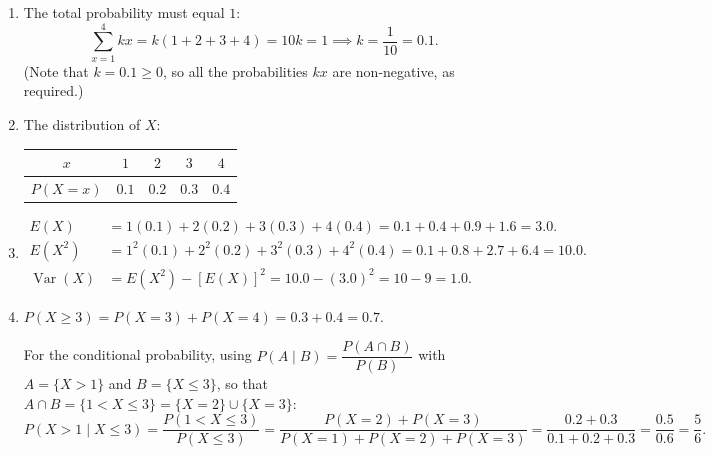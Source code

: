 \documentclass[11pt]{article}
\begin{document}
\begin{corrige}
\begin{enumerate}
\item The total probability must equal $1$:
\[ \sum_{x=1}^{4} kx = k(1 + 2 + 3 + 4) = 10k = 1 \implies k = \frac{1}{10} = 0.1. \]
(Note that $k = 0.1 \ge 0$, so all the probabilities $kx$ are non-negative, as required.)
\item The distribution of $X$:
\begin{center}
\begin{tabular}{|c|c|c|c|c|}
\hline
\rowcolor{popblueL} $x$ & $1$ & $2$ & $3$ & $4$ \\
\hline
$P(X = x)$ & $0.1$ & $0.2$ & $0.3$ & $0.4$ \\
\hline
\end{tabular}
\end{center}
\item 
\begin{align*}
E(X) &= 1(0.1) + 2(0.2) + 3(0.3) + 4(0.4) = 0.1 + 0.4 + 0.9 + 1.6 = 3.0. \\
E(X^2) &= 1^2(0.1) + 2^2(0.2) + 3^2(0.3) + 4^2(0.4) = 0.1 + 0.8 + 2.7 + 6.4 = 10.0. \\
\operatorname{Var}(X) &= E(X^2) - [E(X)]^2 = 10.0 - (3.0)^2 = 10 - 9 = 1.0.
\end{align*}
\item $P(X \ge 3) = P(X=3) + P(X=4) = 0.3 + 0.4 = 0.7$.

For the conditional probability, using $P(A \mid B) = \dfrac{P(A \cap B)}{P(B)}$ with $A = \{X > 1\}$ and $B = \{X \le 3\}$, so that $A \cap B = \{1 < X \le 3\} = \{X = 2\} \cup \{X = 3\}$:
\[ P(X > 1 \mid X \le 3) = \frac{P(1 < X \le 3)}{P(X \le 3)} = \frac{P(X=2) + P(X=3)}{P(X=1) + P(X=2) + P(X=3)} = \frac{0.2 + 0.3}{0.1 + 0.2 + 0.3} = \frac{0.5}{0.6} = \frac{5}{6}. \]
\end{enumerate}
\end{corrige}
\end{document}
